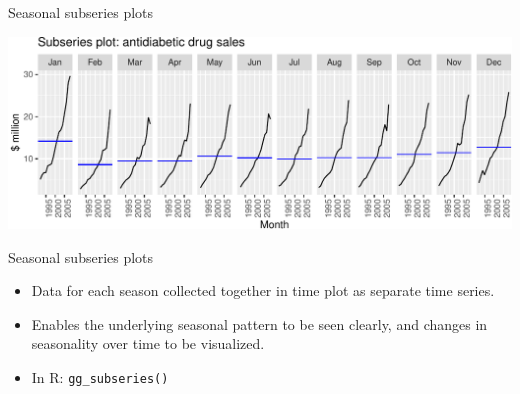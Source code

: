 \documentclass[14pt,ignorenonframetext,aspectratio=169]{beamer}
\newenvironment{Shaded}{\begin{snugshade}}{\end{snugshade}}
\newcommand{\AttributeTok}[1]{\textcolor[rgb]{0.77,0.63,0.00}{#1}}
\newcommand{\FunctionTok}[1]{\textcolor[rgb]{0.00,0.00,0.00}{#1}}
\newcommand{\NormalTok}[1]{#1}
\newcommand{\SpecialCharTok}[1]{\textcolor[rgb]{0.00,0.00,0.00}{#1}}
\newcommand{\StringTok}[1]{\textcolor[rgb]{0.31,0.60,0.02}{#1}}
\providecommand{\tightlist}{%
  \setlength{\itemsep}{0pt}\setlength{\parskip}{0pt}}
\renewenvironment{Shaded}{\color{black}\begin{snugshade}\color{black}}{\end{snugshade}}
\renewenvironment{Shaded}{\color{black}\fontsize{10}{10}\sf\begin{snugshade}\color{black}}{\end{snugshade}}
\begin{document}
\begin{frame}[fragile]{Seasonal subseries plots}
\protect\hypertarget{seasonal-subseries-plots}{}
\fontsize{10}{10}\sf

\begin{Shaded}
\end{Shaded}

\includegraphics{2-tsgraphics_files/figure-beamer/unnamed-chunk-13-1.pdf}
\end{frame}

\begin{frame}[fragile]{Seasonal subseries plots}
\protect\hypertarget{seasonal-subseries-plots-1}{}
\begin{itemize}
\tightlist
\item
  Data for each season collected together in time plot as separate time
  series.
\item
  Enables the underlying seasonal pattern to be seen clearly, and
  changes in seasonality over time to be visualized.
\item
  In R: \texttt{gg\_subseries()}
\end{itemize}
\end{frame}
\end{document}

